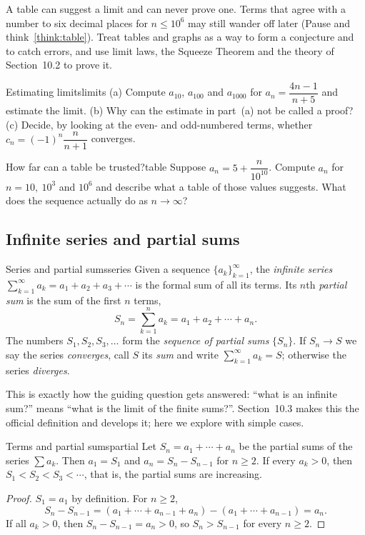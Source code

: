 \documentclass[11pt]{article}
\begin{document}
\begin{warn}
A table can suggest a limit and can never prove one. Terms that agree with a number to six decimal places for $n\le10^6$ may still wander off later (Pause and think~\ref{think:table}). Treat tables and graphs as a way to form a conjecture and to catch errors, and use limit laws, the Squeeze Theorem and the theory of Section~10.2 to prove it.
\end{warn}

\begin{kc}{Estimating limits}{limits}
(a) Compute $a_{10}$, $a_{100}$ and $a_{1000}$ for $a_n=\dfrac{4n-1}{n+5}$ and estimate the limit. (b) Why can the estimate in part~(a) not be called a proof? (c) Decide, by looking at the even- and odd-numbered terms, whether $c_n=(-1)^n\dfrac{n}{n+1}$ converges.
\end{kc}

\begin{think}{How far can a table be trusted?}{table}
Suppose $a_n=5+\dfrac{n}{10^{10}}$. Compute $a_n$ for $n=10,\ 10^3$ and $10^6$ and describe what a table of those values suggests. What does the sequence actually do as $n\to\infty$?
\end{think}

\subsection*{Infinite series and partial sums}

\begin{defn}{Series and partial sums}{series}
Given a sequence $\{a_k\}_{k=1}^{\infty}$, the \emph{infinite series} $\sum_{k=1}^{\infty}a_k=a_1+a_2+a_3+\cdots$ is the formal sum of all its terms. Its $n$th \emph{partial sum} is the sum of the first $n$ terms,
\[
S_n=\sum_{k=1}^{n}a_k=a_1+a_2+\cdots+a_n .
\]
The numbers $S_1,S_2,S_3,\dots$ form the \emph{sequence of partial sums} $\{S_n\}$. If $S_n\to S$ we say the series \emph{converges}, call $S$ its \emph{sum} and write $\sum_{k=1}^\infty a_k=S$; otherwise the series \emph{diverges}.
\end{defn}

This is exactly how the guiding question gets answered: ``what is an infinite sum?'' means ``what is the limit of the finite sums?''. Section~10.3 makes this the official definition and develops it; here we explore with simple cases.

\begin{thm}{Terms and partial sums}{partial}
Let $S_n=a_1+\cdots+a_n$ be the partial sums of the series $\sum a_k$. Then $a_1=S_1$ and $a_n=S_n-S_{n-1}$ for $n\ge2$. If every $a_k>0$, then $S_1<S_2<S_3<\cdots$, that is, the partial sums are increasing.
\end{thm}
\begin{proof}
$S_1=a_1$ by definition. For $n\ge2$,
\[
S_n-S_{n-1}=(a_1+\cdots+a_{n-1}+a_n)-(a_1+\cdots+a_{n-1})=a_n .
\]
If all $a_k>0$, then $S_n-S_{n-1}=a_n>0$, so $S_n>S_{n-1}$ for every $n\ge2$.
\end{proof}
\end{document}
